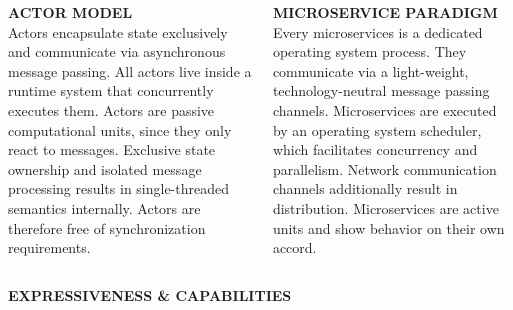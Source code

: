 \documentclass[final,hyperref={pdfpagelabels=true}]{beamer}
\begin{document}
\begin{frame}
\begin{columns}[t]
\begin{column}{.45\textwidth}
{        }
      \end{column}
    \end{columns}

    \vspace*{2\baselineskip}

    \begin{columns}[t]
    \begin{column}{.45\textwidth}
      \textsf{\textbf{ACTOR MODEL}} \\
      \vspace*{\baselineskip}
      {\lmodern
        Actors encapsulate state exclusively and communicate via asynchronous message passing. All actors live inside a runtime system that concurrently executes them. Actors are passive computational units, since they only react to messages. Exclusive state ownership and isolated message processing results in single-threaded semantics internally. Actors are therefore free of synchronization requirements.
      }
    \end{column}

    \begin{column}{.45\textwidth}
      \textsf{\textbf{MICROSERVICE PARADIGM}} \\
      \vspace*{\baselineskip}
      {\lmodern
        Every microservices is a dedicated operating system process. They communicate via a light-weight, technology-neutral message passing channels. Microservices are executed by an operating system scheduler, which facilitates concurrency and parallelism. Network communication channels additionally result in distribution. Microservices are active units and show behavior on their own accord.
      }
    \end{column}
  \end{columns}

  \vspace*{2\baselineskip}
  
  \begin{columns}[t]
    \begin{column}{.45\textwidth}
      \textsf{\textbf{EXPRESSIVENESS \& CAPABILITIES}} \\
      \vspace*{\baselineskip}
      {\lmodern

}
\end{column}
\end{columns}
\end{frame}
\end{document}
